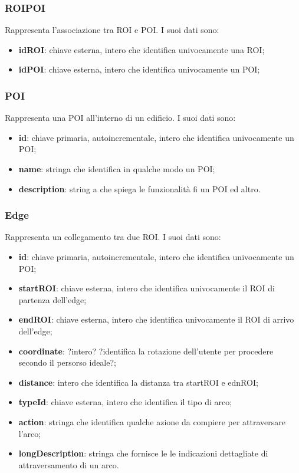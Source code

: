 \documentclass[../SpecificaTecnica.tex]{subfiles}
\begin{document}
		\subsubsection{ROIPOI}
			Rappresenta l'associazione tra ROI e POI. I suoi dati sono:
			\begin{itemize}
				\item \textbf{idROI}: chiave esterna, intero che identifica univocamente una ROI;
				\item \textbf{idPOI}: chiave esterna, intero che identifica univocamente un POI;
			\end{itemize}
		\subsubsection{POI}
			Rappresenta una POI all'interno di un edificio. I suoi dati sono:
			\begin{itemize}
				\item \textbf{id}: chiave primaria, autoincrementale, intero che identifica univocamente un POI;
				\item \textbf{name}: stringa che identifica in qualche modo un POI;
				\item \textbf{description}: string a che spiega le funzionalità fi un POI ed altro.
			\end{itemize}
		\subsubsection{Edge}
			Rappresenta un collegamento tra due ROI. I suoi dati sono:
			\begin{itemize}
				\item \textbf{id}: chiave primaria, autoincrementale, intero che identifica univocamente un POI;
				\item \textbf{startROI}: chiave esterna, intero che identifica univocamente il ROI di partenza dell'edge;
				\item \textbf{endROI}: chiave esterna, intero che identifica univocamente il ROI di arrivo dell'edge;
				\item \textbf{coordinate}: ?intero? ?identifica la rotazione dell'utente per procedere secondo il persorso ideale?;
				\item \textbf{distance}: intero che identifica la distanza tra startROI e ednROI;
				\item \textbf{typeId}: chiave esterna, intero che identifica il tipo di arco;
				\item \textbf{action}: stringa che identifica qualche azione da compiere per attraversare l'arco;
				\item \textbf{longDescription}: stringa che fornisce le le indicazioni dettagliate di attraversamento di un arco.
			\end{itemize}
\end{document}
